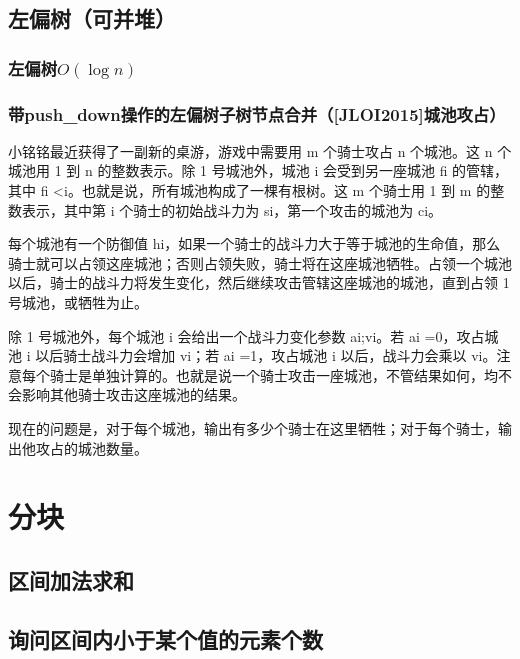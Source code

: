 \documentclass[twoside,a4paper]{article}
\begin{document}
\subsection{左偏树（可并堆）}

\subsubsection{左偏树$O(\log n)$}


\subsubsection{带push\_down操作的左偏树子树节点合并（[JLOI2015]城池攻占）}
小铭铭最近获得了一副新的桌游，游戏中需要用 m 个骑士攻占 n 个城池。这 n 个城池用 1 到 n 的整数表示。除 1 号城池外，城池 i 会受到另一座城池 fi 的管辖，其中 fi <i。也就是说，所有城池构成了一棵有根树。这 m 个骑士用 1 到 m 的整数表示，其中第 i 个骑士的初始战斗力为 si，第一个攻击的城池为 ci。\par
每个城池有一个防御值 hi，如果一个骑士的战斗力大于等于城池的生命值，那么骑士就可以占领这座城池；否则占领失败，骑士将在这座城池牺牲。占领一个城池以后，骑士的战斗力将发生变化，然后继续攻击管辖这座城池的城池，直到占领 1 号城池，或牺牲为止。\par
除 1 号城池外，每个城池 i 会给出一个战斗力变化参数 ai;vi。若 ai =0，攻占城池 i 以后骑士战斗力会增加 vi；若 ai =1，攻占城池 i 以后，战斗力会乘以 vi。注意每个骑士是单独计算的。也就是说一个骑士攻击一座城池，不管结果如何，均不会影响其他骑士攻击这座城池的结果。\par
现在的问题是，对于每个城池，输出有多少个骑士在这里牺牲；对于每个骑士，输出他攻占的城池数量。\par


\section{分块}

\subsection{区间加法求和}


\subsection{询问区间内小于某个值的元素个数}

\end{document}
